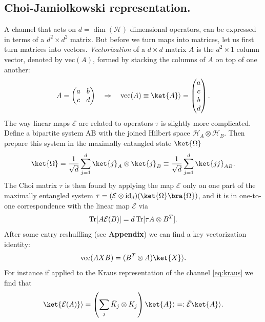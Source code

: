 \subsection{Choi-Jamiolkowski representation.} A channel that acts on $d = \dim(\mathcal{H})$ dimensional operators, can be expressed in terms of a $d^2\times d^2$ matrix. But before we turn maps into matrices, let us first turn matrices into vectors. \textit{Vectorization} of a $d\times d$ matrix $A$ is the $d^2 \times 1$ column vector, denoted by $\mathrm{vec}(A)$, formed by stacking the columns of $A$ on top of one another:
$$
A = 
\begin{pmatrix}
    a &\! b \\
    c &\! d
\end{pmatrix}
\quad \Rightarrow \quad 
\mathrm{vec}(A) \equiv \ket{A}\rangle = 
\begin{pmatrix}
    a \\
    c \\
    b \\
    d
\end{pmatrix}.
$$
The way linear maps $\mathcal{E}$ are related to operators $\tau$ is slightly more complicated. Define a bipartite system $\mathrm{AB}$ with the joined Hilbert space $\mathcal{H}_A \otimes \mathcal{H}_B$. Then prepare this system in the maximally entangled state $\ket{\Omega}$
\begin{equation}
    \ket{\Omega} = \frac{1}{\sqrt{d}} \sum_{j=1}^d \ket{j}_A \otimes \ket{j}_B \equiv \frac{1}{\sqrt{d}} \sum_{j=1}^d \ket{jj}_{AB}.
\end{equation}
The Choi matrix $\tau$ is then found by applying the map $\mathcal{E}$ only on one part of the maximally entangled system $\tau = (\mathcal{E} \otimes \id_d)(\ket{\Omega}\bra{\Omega})$, and it is in one-to-one correspondence with the linear map $\mathcal{E}$ via
\begin{equation}
    \operatorname{Tr}[A \mathcal{E}(B)] = d \operatorname{Tr}[\tau A \otimes B^T].
\end{equation}
After some entry reshuffling (see \textbf{Appendix}) we can find a key vectorization identity:
\begin{equation}
    \mathrm{vec} (AXB) = (B^T \otimes A) \ket{X}\rangle.
\end{equation}
For instance if applied to the Kraus representation of the channel \eqref{eq:kraus}
we find that
\begin{equation}
    \label{eq:vectorized_kraus}
    \ket{\mathcal{E}(A)}\rangle = \left(\sum_j \bar K_j \otimes K_j\right)\ket{A}\rangle =: \hat{\mathcal{E}}\ket{A}\rangle.
\end{equation}

